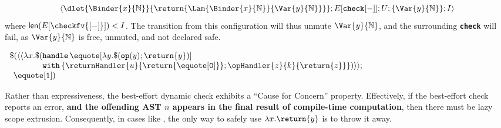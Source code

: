 \[\langle \dlet{\Binder{x}{\mathbb{N}}}{\return{\Lam{\Binder{x}{\mathbb{N}}}{\Var{y}{\mathbb{N}}}}}; E[\textbf{\texttt{check}}[-]]; U; \{\Var{y}{\mathbb{N}}\} ; I \rangle\]
where $\textsf{len}(E[\checkfv{[-]}]) < I$. The transition from this configuration will thus unmute $\Var{y}{\mathbb{N}}$, and the surrounding \textbf{\texttt{check}} will fail, as $\Var{y}{\mathbb{N}}$ is free, unmuted, and not declared safe.

\begin{code}
  \begin{source}
    $
    \begin{array}{l}
      \$(\langle \langle \lambda x. \$ (\textbf{\texttt{handle}} \, \equote[{\lambda y. \$(\textbf{\texttt{op}}(y); \return{y})}]\\
      \quad\quad\quad\quad\textbf{\texttt{with}} \, \{ \returnHandler{u}{\return{\equote[\texttt{0}]}}; \opHandler{z}{k}{\return{z}}\})\rangle\rangle;\\
      \;\, \equote[{\texttt{1}}])
    \end{array}
    $
  \end{source}
  \label{listing:best-effort-imperfect}
\end{code}

Rather than expressiveness, the best-effort dynamic check exhibits a ``Cause for Concern'' property. Effectively, if the best-effort check reports an error, \textbf{and the offending AST $n$ appears in the final result of compile-time computation}, then there must be lazy scope extrusion. Consequently, in cases like , the only way to safely use $\lambda x.\return{y}$ is to throw it away. 

